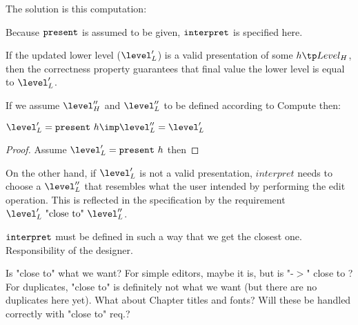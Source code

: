The solution is this computation: 


Because ${\tt present}$ is assumed to be given, ${\tt interpret}$ is specified here.

If the updated lower level ($\level'_{L}$) is a valid presentation of some $h \tp Level_H$, then the correctness property guarantees that final value the lower level is equal to $\level'_{L}$.

If we assume $\level''_{H}$ and $\level''_{L}$ to be defined according to {\sc Compute} then:

$\level'_L = \present~h \imp \level''_{L} = \level'_{L}$
\begin{proof} Assume $\level'_L = \present~h$ then
\end{proof}


On the other hand, if $\level'_{L}$ is not a valid presentation, $interpret$ needs to choose a  $\level''_{L}$ that resembles what the user intended by performing the edit operation. This is reflected in the specification by the requirement $\level'_{L}~\text{"close to"}~\level''_{L}$.

\bl
\* ${\tt interpret}$ must be defined in such a way that we get the closest one.
\* Responsibility of the designer.
\el

\bl
\* Is "close to" what we want? For simple editors, maybe it is, but is "-$>$" close to \rarr? For duplicates, "close to" is definitely not what we want (but there are no duplicates here yet).
\* What about Chapter titles and fonts? Will these be handled correctly with "close to" req.?
\el



